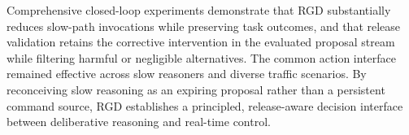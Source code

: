 \documentclass[letterpaper,journal]{IEEEtran}
\begin{document}
Comprehensive closed-loop experiments demonstrate that RGD substantially
reduces slow-path invocations while preserving task outcomes, and that release
validation retains the corrective intervention in the evaluated proposal stream
while filtering harmful or negligible alternatives. The common action interface
remained effective across slow reasoners and diverse traffic scenarios. By reconceiving
slow reasoning as an expiring proposal rather than a persistent command source,
RGD establishes a principled, release-aware decision interface between
deliberative reasoning and real-time control.

\balance


\end{document}
